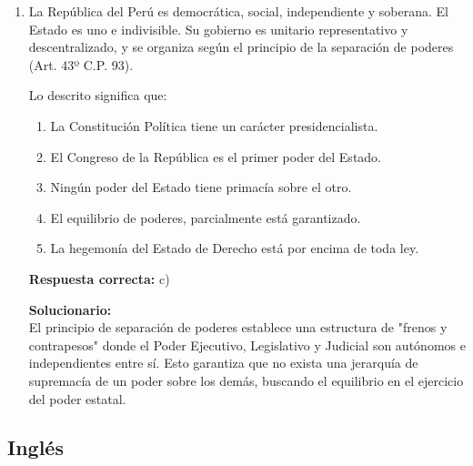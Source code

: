 \begin{enumerate}
	
	\item La República del Perú es democrática, social, independiente y soberana. El Estado es uno e indivisible. Su gobierno es unitario representativo y descentralizado, y se organiza según el principio de la separación de poderes (Art. 43º C.P. 93).
	
	Lo descrito significa que:
	
	\begin{enumerate}[label=\alph*)]
		\item La Constitución Política tiene un carácter presidencialista.
		\item El Congreso de la República es el primer poder del Estado.
		\item Ningún poder del Estado tiene primacía sobre el otro.
		\item El equilibrio de poderes, parcialmente está garantizado.
		\item La hegemonía del Estado de Derecho está por encima de toda ley.
	\end{enumerate}
	
	\textbf{Respuesta correcta:} c)
	
	\vspace{2mm}
	\textbf{Solucionario:}\\
	El principio de separación de poderes establece una estructura de "frenos y contrapesos" donde el Poder Ejecutivo, Legislativo y Judicial son autónomos e independientes entre sí. Esto garantiza que no exista una jerarquía de supremacía de un poder sobre los demás, buscando el equilibrio en el ejercicio del poder estatal.
	
	
	
	\vspace{6mm}
	
	
	
	\vspace{6mm}
	
\end{enumerate}




\subsection*{Inglés}


